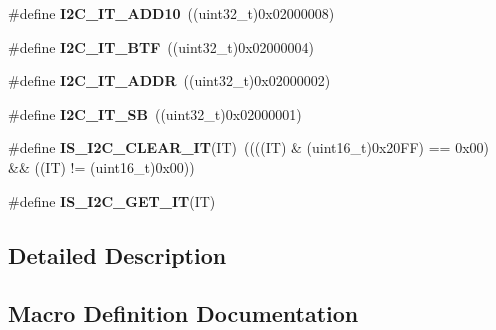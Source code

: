 \begin{DoxyCompactItemize}
\item 
\hypertarget{group___i2_c__interrupts__definition_ga8a9bc5a1dee3bbd41347b19cf117c0f3}{}\#define {\bfseries I2\+C\+\_\+\+I\+T\+\_\+\+A\+D\+D10}~((uint32\+\_\+t)0x02000008)\label{group___i2_c__interrupts__definition_ga8a9bc5a1dee3bbd41347b19cf117c0f3}

\item 
\hypertarget{group___i2_c__interrupts__definition_gaef469fef934f655614b7cffd00b87ceb}{}\#define {\bfseries I2\+C\+\_\+\+I\+T\+\_\+\+B\+T\+F}~((uint32\+\_\+t)0x02000004)\label{group___i2_c__interrupts__definition_gaef469fef934f655614b7cffd00b87ceb}

\item 
\hypertarget{group___i2_c__interrupts__definition_gaf68f1eda33dcb13626597f477d044025}{}\#define {\bfseries I2\+C\+\_\+\+I\+T\+\_\+\+A\+D\+D\+R}~((uint32\+\_\+t)0x02000002)\label{group___i2_c__interrupts__definition_gaf68f1eda33dcb13626597f477d044025}

\item 
\hypertarget{group___i2_c__interrupts__definition_gaec2fb9bbd0e1b128b4450b2a7b312896}{}\#define {\bfseries I2\+C\+\_\+\+I\+T\+\_\+\+S\+B}~((uint32\+\_\+t)0x02000001)\label{group___i2_c__interrupts__definition_gaec2fb9bbd0e1b128b4450b2a7b312896}

\item 
\hypertarget{group___i2_c__interrupts__definition_ga368c05fc9aadd7bb4d23280791b5a751}{}\#define {\bfseries I\+S\+\_\+\+I2\+C\+\_\+\+C\+L\+E\+A\+R\+\_\+\+I\+T}(I\+T)~((((I\+T) \& (uint16\+\_\+t)0x20\+F\+F) == 0x00) \&\& ((\+I\+T) != (uint16\+\_\+t)0x00))\label{group___i2_c__interrupts__definition_ga368c05fc9aadd7bb4d23280791b5a751}

\item 
\#define {\bfseries I\+S\+\_\+\+I2\+C\+\_\+\+G\+E\+T\+\_\+\+I\+T}(I\+T)
\end{DoxyCompactItemize}


\subsection{Detailed Description}


\subsection{Macro Definition Documentation}
\hypertarget{group___i2_c__interrupts__definition_gab3d113f3d6b6e6f7896c5d7a8d8c2d01}{}
